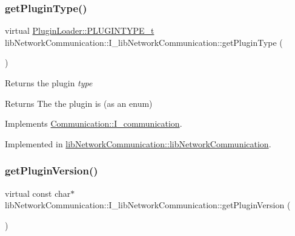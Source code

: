 \mbox{\label{classlibNetworkCommunication_1_1I__libNetworkCommunication_a22412ea75e41d612c66c42b3c4dab1f3}} 
\subsubsection{\texorpdfstring{getPluginType()}{getPluginType()}}
{\footnotesize\ttfamily virtual \mbox{\hyperlink{namespacePluginLoader_a7b1358e9577b47b5d4b16231a5a81699}{Plugin\+Loader\+::\+P\+L\+U\+G\+I\+N\+T\+Y\+P\+E\+\_\+t}} lib\+Network\+Communication\+::\+I\+\_\+lib\+Network\+Communication\+::get\+Plugin\+Type (\begin{DoxyParamCaption}{ }\end{DoxyParamCaption})\hspace{0.3cm}{\ttfamily [pure virtual]}}



Returns the plugin {\itshape type} 

\begin{DoxyReturn}{Returns}
The the plugin is (as an enum) 
\end{DoxyReturn}


Implements \mbox{\hyperlink{classCommunication_1_1I__communication_a531577d9a13f3fcb566a350b74184823}{Communication\+::\+I\+\_\+communication}}.



Implemented in \mbox{\hyperlink{classlibNetworkCommunication_1_1libNetworkCommunication_a6851c7c48cde1af3d2b6e131fce6b8bc}{lib\+Network\+Communication\+::lib\+Network\+Communication}}.

\mbox{\label{classlibNetworkCommunication_1_1I__libNetworkCommunication_a07a5da99fc896208065f34aa89453499}} 
\subsubsection{\texorpdfstring{getPluginVersion()}{getPluginVersion()}}
{\footnotesize\ttfamily virtual const char$\ast$ lib\+Network\+Communication\+::\+I\+\_\+lib\+Network\+Communication\+::get\+Plugin\+Version (\begin{DoxyParamCaption}{ }\end{DoxyParamCaption})\hspace{0.3cm}{\ttfamily [pure virtual]}}



